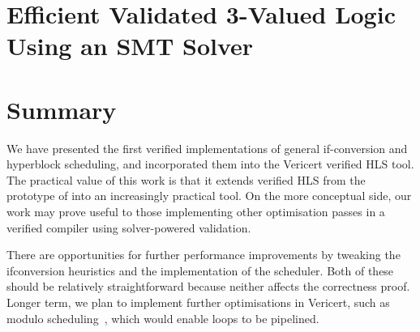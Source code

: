 {%

\section{Efficient Validated 3-Valued Logic Using an SMT Solver}
\label{sec:hs:efficient-smt-solver-validation}


\section{Summary}

We have presented the first verified implementations of general if-conversion
and hyperblock scheduling, and incorporated them into the Vericert verified HLS
tool. The practical value of this work is that it extends verified HLS from the
prototype of \textcite{herklotz21_fvhls} into an
increasingly practical tool. On the more conceptual side, our work may prove
useful to those implementing other optimisation passes in a verified compiler
using solver-powered validation.

There are opportunities for further performance improvements by tweaking the
if\?conversion heuristics and the implementation of the scheduler. Both of these
should be relatively straightforward because neither affects the correctness
proof. Longer term, we plan to implement further optimisations in Vericert, such
as modulo scheduling~\cite{zhang13_sdc}, which would enable loops to be
pipelined.

}
